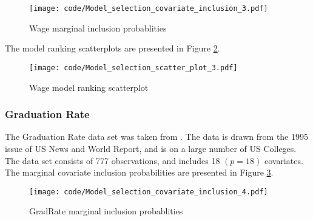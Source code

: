 \documentclass{amsart}[12pt]
\begin{document}

\begin{figure}[p]
	\texttt{[image: code/Model\_selection\_covariate\_inclusion\_3.pdf]}
	\caption{Wage marginal inclusion probablities}
	\label{fig:Wage_inclusion}
\end{figure}

The model ranking scatterplots are presented in Figure \ref{fig:Wage_model_ranking}.

\begin{figure}[p]
	\texttt{[image: code/Model\_selection\_scatter\_plot\_3.pdf]}
	\caption{Wage model ranking scatterplot}
	\label{fig:Wage_model_ranking}
\end{figure}


\subsubsection{Graduation Rate}

The Graduation Rate data set was taken from \cite{James:2014:ISL:2517747}. The data is drawn from the 1995
issue of US News and World Report, and is on a large number of US Colleges. The data set consists of 777
observations, and includes 18 $(p=18)$ covariates. The marginal covariate inclusion probabilities are
presented in Figure \ref{fig:GradRate_inclusion}.


\begin{figure}[p]
	\texttt{[image: code/Model\_selection\_covariate\_inclusion\_4.pdf]}
	\caption{GradRate marginal inclusion probablities}
	\label{fig:GradRate_inclusion}
\end{figure}
\end{document}
